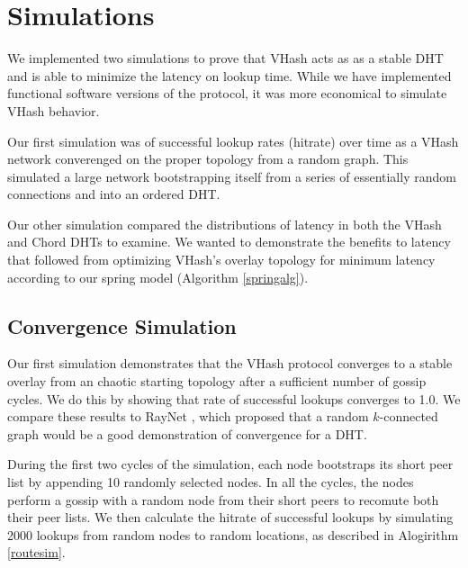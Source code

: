 \documentclass{IEEEtran}
\begin{document}



\section{Simulations}
We implemented two simulations to prove that VHash acts as as a stable DHT and is able to minimize the latency on lookup time.
While we have implemented functional software versions of the protocol, it was more economical to simulate VHash behavior.

Our first simulation was of successful lookup rates (hitrate) over time as a VHash network converenged on the proper topology from a random graph.  
This simulated a large network bootstrapping itself from a series of essentially random connections and into an ordered DHT.
  
Our other simulation compared the distributions of latency in both the VHash and Chord DHTs to examine. 
We wanted to demonstrate the benefits to latency that followed from optimizing VHash's overlay topology for minimum latency according to our spring model (Algorithm \ref{springalg}).

\subsection{Convergence Simulation}
Our first simulation demonstrates that the VHash protocol converges to a stable overlay from an chaotic starting topology after a sufficient number of gossip cycles.  
We do this by showing that rate of successful lookups converges to 1.0.
We compare these results to RayNet \cite{raynet}, which proposed that a random $k$-connected graph would be a good demonstration of convergence for a DHT.

During the first two cycles of the simulation, each node bootstraps its short peer list by appending 10 randomly selected nodes. 
In all the cycles, the nodes perform a gossip with a random node from their short peers to recomute both their peer lists.
We then calculate the hitrate of successful lookups by simulating 2000 lookups from random nodes to random locations, as described in Alogirithm \ref{routesim}.
\end{document}
